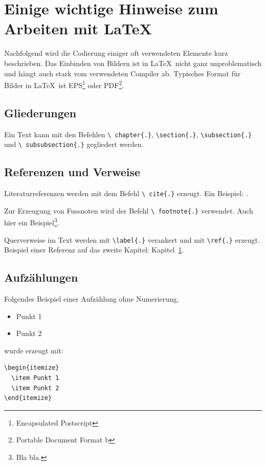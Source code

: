 
\chapter{Einige wichtige Hinweise zum Arbeiten mit \LaTeX\ }\label{sec:latexumg}

Nachfolgend wird die Codierung einiger oft verwendeten Elemente
kurz beschrieben. Das Einbinden von Bildern ist in \LaTeX\ nicht
ganz unproblematisch und hängt auch stark vom verwendeten Compiler
ab. Typisches Format für Bilder in \LaTeX\ ist
EPS\footnote{Encapsulated Postscript} oder PDF\footnote{Portable Document Format b}.


\section{Gliederungen}\label{sec:gliederung}

Ein Text kann mit den Befehlen \texttt{\textbackslash
chapter\{.\}}, \texttt{\textbackslash section\{.\}},
\texttt{\textbackslash subsection\{.\}} und \texttt{\textbackslash
subsubsection\{.\}} gegliedert werden.


\section{Referenzen und Verweise}\label{sec:refverw}

Literaturreferenzen werden mit dem Befehl \texttt{\textbackslash
cite\{.\}} erzeugt. Ein Beispiel: \cite{comfilt}.

Zur Erzeugung von Fussnoten wird der Befehl \texttt{\textbackslash
footnote\{.\}} verwendet. Auch hier ein Beispiel\footnote{Bla
bla.}.

Querverweise im Text werden mit \texttt{\textbackslash label\{.\}}
verankert und mit \texttt{\textbackslash ref\{.\}} erzeugt.
Beispiel einer Referenz auf das zweite Kapitel:
Kapitel~\ref{sec:latexumg}.


\section{Aufzählungen}\label{sec:aufz}

Folgendes Beispiel einer Aufzählung ohne Numerierung,
\begin{itemize}
  \item Punkt 1
  \item Punkt 2
\end{itemize}
wurde erzeugt mit:
\begin{verbatim}
\begin{itemize}
  \item Punkt 1
  \item Punkt 2
\end{itemize}
\end{verbatim}


